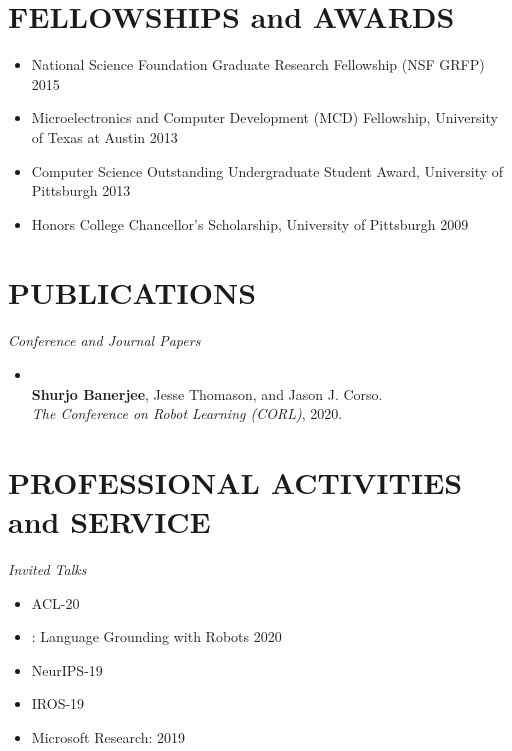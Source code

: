\documentclass{res}
\newcommand{\citehref}[2]{\href{#1}{\color{darkblue}{#2}}}
\begin{document}
\begin{resume}
 \section{FELLOWSHIPS and AWARDS}

 \begin{itemize}
  \item National Science Foundation Graduate Research Fellowship (NSF GRFP) \hfill 2015
  \item Microelectronics and Computer Development (MCD) Fellowship, University of Texas at Austin \hfill 2013
  \item Computer Science Outstanding Undergraduate Student Award, University of Pittsburgh \hfill 2013
  \item Honors College Chancellor's Scholarship, University of Pittsburgh \hfill 2009
\end{itemize}

\section{PUBLICATIONS}

{\sl Conference and Journal Papers}
\begin{itemize}\item \citehref{https://arxiv.org/abs/2010.12639}{The RobotSlang Benchmark: Dialog-guided Robot Localization and Navigation}\\{\bf Shurjo Banerjee}, Jesse Thomason, and Jason J. Corso.\\\textit{The Conference on Robot Learning (CORL)}, 2020.
\end{itemize}

\section{PROFESSIONAL ACTIVITIES and SERVICE}

{\sl Invited Talks}
  \begin{itemize}
    \item \citehref{https://sites.google.com/view/2ndnlp4convai/}{Workshop on NLP for Conversational AI} \hfill ACL-20
    \item \citehref{https://www.cs.princeton.edu/courses/archive/spring20/cos598C/}{Princeton COS 598C}: Language Grounding with Robots \hfill 2020
    \item \citehref{https://vigilworkshop.github.io/}{Visually Grounded Interaction and Language (ViGIL) Workshop} \hfill NeurIPS-19
    \item \citehref{https://sites.google.com/view/spar2019/speakers}{Semantic Policy and Action Representations for Autonomous Robots (SPAR) Workshop} \hfill IROS-19
    \item Microsoft Research: \citehref{https://www.youtube.com/watch?v=XL3FMpceYoE}{Vision-and-Dialog Navigation} \hfill 2019
  \end{itemize}


\end{resume}
\end{document}
